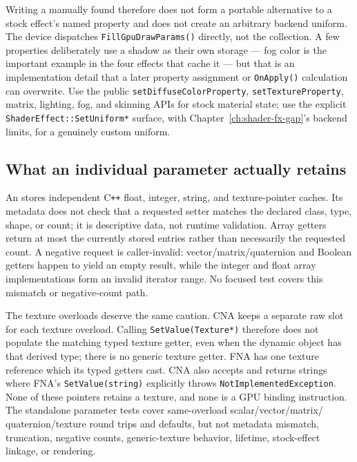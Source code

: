 Writing a manually found  therefore does not form a portable
alternative to a stock effect's named property and does not create an arbitrary backend uniform.
The device dispatches \texttt{FillGpuDrawParams()} directly, not the collection. A few
properties deliberately use a shadow as their own storage --- fog color is the important example
in the four effects that cache it --- but that is an implementation detail that a later property
assignment or \texttt{OnApply()} calculation can overwrite. Use the public
\texttt{setDiffuseColorProperty}, \texttt{setTextureProperty}, matrix, lighting, fog, and
skinning APIs for stock material state; use the explicit \texttt{ShaderEffect::SetUniform*}
surface, with Chapter~\ref{ch:shader-fx-gap}'s backend limits, for a genuinely custom uniform.

\subsection{What an individual parameter actually retains}

An  stores independent C\texttt{++} float, integer, string, and
texture-pointer caches. Its metadata does not check that a requested setter matches the declared
class, type, shape, or count; it is descriptive data, not runtime validation. Array getters
return at most the currently stored entries rather than necessarily the requested count. A
negative request is caller-invalid: vector/matrix/quaternion and Boolean getters happen to yield
an empty result, while the integer and float array implementations form an invalid iterator range.
No focused test covers this mismatch or negative-count path.

The texture overloads deserve the same caution. CNA keeps a separate raw slot for each texture
overload. Calling \texttt{SetValue(Texture*)} therefore does not populate the matching typed
texture getter, even when the dynamic object has that derived type; there is no generic texture
getter. FNA has one texture reference which its typed getters cast. CNA also accepts and returns
strings where FNA's \texttt{SetValue(string)} explicitly throws
\texttt{NotImplementedException}. None of these pointers retains a texture, and none is a GPU
binding instruction. The standalone parameter tests cover same-overload scalar/vector/matrix/
quaternion/texture round trips and defaults, but not metadata mismatch, truncation, negative
counts, generic-texture behavior, lifetime, stock-effect linkage, or rendering.

